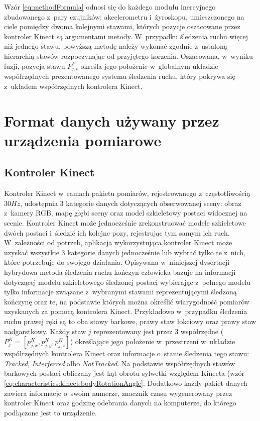 		
Wzór \ref{eq:methodFormula} odnosi się do każdego modułu inercyjnego zbudowanego z~pary czujników: akcelerometru i~żyroskopu, umieszczonego na ciele pomiędzy dwoma kolejnymi stawami, których pozycje oszacowane przez kontroler Kinect są argumentami metody. W~przypadku śledzenia ruchu więcej niż jednego stawu, powyższą metodę należy wykonać zgodnie z~ustaloną hierarchią stawów rozpoczynając od przyjętego korzenia. Oszacowana, w~wyniku fuzji, pozycja stawu $P^F_{j,t}$ określa jego położenie w~globalnym układzie współrzędnych prezentowanego systemu śledzenia ruchu, który pokrywa się z~układem współrzędnych kontrolera Kinect.
		
\section{Format danych używany przez urządzenia pomiarowe}
\subsection{Kontroler Kinect}
Kontroler Kinect w~ramach pakietu pomiarów, rejestrowanego z~częstotliwością $30 Hz$, udostępnia 3 kategorie danych dotyczących obserwowanej sceny: obraz z~kamery RGB, mapę głębi sceny oraz model szkieletowy postaci widocznej na scenie. Kontroler Kinect może jednocześnie zrekonstruować modele szkieletowe dwóch postaci i~śledzić ich kolejne pozy, rejestrując tym samym ich ruch. W~zależności od potrzeb, aplikacja wykorzystująca kontroler Kinect może uzyskać wszystkie 3 kategorie danych jednocześnie lub wybrać tylko te z~nich, które potrzebuje do swojego działania. Opisywana w~niniejszej dysertacji hybrydowa metoda śledzenia ruchu kończyn człowieka bazuje na informacji dotyczącej modelu szkieletowego śledzonej postaci wybierając z~pełnego modelu tylko informacje związane z~wybranymi stawami reprezentującymi śledzoną kończynę oraz te, na podstawie których można określić wiarygodność pomiarów uzyskanych za pomocą kontrolera Kinect. Przykładowo w~przypadku śledzenia ruchu prawej ręki są to oba stawy barkowe, prawy staw łokciowy oraz prawy staw nadgarstkowy. Każdy staw $j$ reprezentowany jest przez 3 współrzędne ($P^K_j = [p^K_{j,x}, p^K_{j,y}, p^K_{j,z}]$) określające jego położenie w~przestrzeni w~układzie współrzędnych kontrolera Kinect oraz informacje o~stanie śledzenia tego stawu: \emph{Tracked}, \emph{Interferred} albo \emph{NotTracked}. Na podstawie współrzędnych stawów barkowych postaci obliczany jest kąt obrotu sylwetki względem Kinecta (wzór \ref{eq:characteristics:kinect:bodyRotationAngle}. Dodatkowo każdy pakiet danych zawiera informacje o~swoim numerze, znacznik czasu wygenerowany przez kontroler Kinect oraz godzinę odebrania danych na komputerze, do którego podłączone jest to urządzenie.
		
